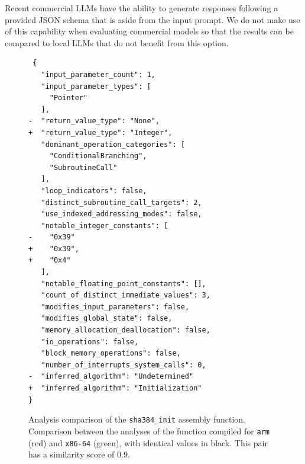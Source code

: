 Recent commercial LLMs have the ability to generate responses following a provided JSON schema that is aside from the input prompt.
We do not make use of this capability when evaluating commercial models so that the results can be compared to local LLMs
that do not benefit from this option.

\begin{figure}
\centering
\begin{minipage}{0.95\linewidth}
\begin{verbatim}
 {
   "input_parameter_count": 1,
   "input_parameter_types": [
     "Pointer"
   ],
-  "return_value_type": "None",
+  "return_value_type": "Integer",
   "dominant_operation_categories": [
     "ConditionalBranching",
     "SubroutineCall"
   ],
   "loop_indicators": false,
   "distinct_subroutine_call_targets": 2,
   "use_indexed_addressing_modes": false,
   "notable_integer_constants": [
-    "0x39"
+    "0x39",
+    "0x4"
   ],
   "notable_floating_point_constants": [],
   "count_of_distinct_immediate_values": 3,
   "modifies_input_parameters": false,
   "modifies_global_state": false,
   "memory_allocation_deallocation": false,
   "io_operations": false,
   "block_memory_operations": false,
   "number_of_interrupts_system_calls": 0,
-  "inferred_algorithm": "Undetermined"
+  "inferred_algorithm": "Initialization"
}
\end{verbatim}
\caption{Analysis comparison of the \texttt{sha384\_init} assembly function. Comparison between the analyses of the function compiled 
for \texttt{arm} (red) and \texttt{x86-64} (green), with identical values in black. This pair has a similarity score of \(0.9\).}
\label{feature-diff}
\end{minipage}
\end{figure}

